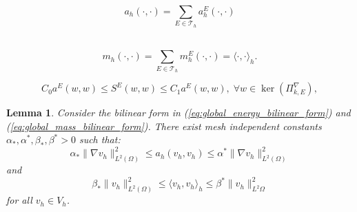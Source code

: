 \documentclass[10pt,a4paper]{amsart}
\newtheorem{lemma}{Lemma}
\newcommand{\scalenergyproj}{\Pi^{\nabla}_{k,E}}
\begin{document}
\begin{equation}\label{eq:global_energy_bilinear_form}
    a_h(\cdot, \cdot) = \sum \limits_{E\in\mathcal{T}_h}a^E_h (\cdot, \cdot)
\end{equation}\

\begin{equation}\label{eq:global_mass_bilinear_form}
    m_h (\cdot, \cdot) = \sum \limits_{E\in \mathcal{T}_h} m^E_h (\cdot, \cdot) = \langle \cdot, \cdot \rangle_h.
\end{equation}

\begin{equation}\label{eq:stability_term_condition}
    C_0 a^E(w, w) \leq S^E(w,w) \leq C_1 a^E(w,w), \; \forall w \in \ker(\scalenergyproj),
\end{equation}

\begin{lemma}
    Consider the bilinear form in (\ref{eq:global_energy_bilinear_form}) and (\ref{eq:global_mass_bilinear_form}). There exist mesh independent constants $\alpha_*, \alpha^*, \beta_*, \beta^* > 0$ such that:
    \begin{equation}\label{eq:aux_ineq_energy_stab}
        \alpha_* \| \nabla v_h \|_{L^2(\Omega)}^2 \leq a_h (v_h, v_h) \leq \alpha^* \| \nabla v_h \|^2_{L^2(\Omega)}
    \end{equation}
    and
    \begin{equation}\label{eq:aux_ineq_mass_stab}
        \beta_* \| v_h \|_{L^2(\Omega)}^2 \leq \langle v_h, v_h \rangle_h \leq \beta^* \| v_h \|_{L^2{\Omega}}^2
    \end{equation}
    for all $v_h \in V_h$.
\end{lemma}
\end{document}

